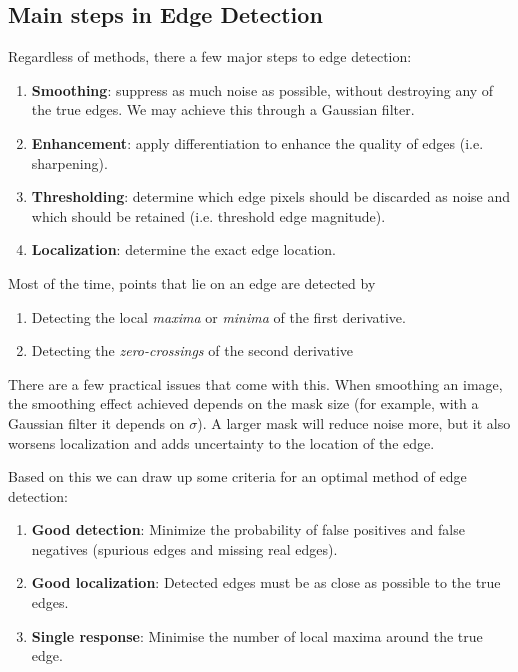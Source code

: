 \documentclass{article}
\begin{document}
	\subsection{Main steps in Edge Detection}
	Regardless of methods, there a few major steps to edge detection:
		\begin{enumerate}
			\item \textbf{Smoothing}: suppress as much noise as possible, without destroying any of the true edges. We may achieve this through a Gaussian filter.
			\item \textbf{Enhancement}: apply differentiation to enhance the quality of edges (i.e. sharpening).
			\item \textbf{Thresholding}: determine which edge pixels should be discarded as  noise and which should be retained (i.e. threshold edge magnitude).
			
			\item \textbf{Localization}: determine the exact edge location.
		\end{enumerate}

	\par
	Most of the time, points that lie on an edge are detected by 
		\begin{enumerate}
			\item Detecting the local \textit{maxima} or \textit{minima} of the first derivative.
			\item Detecting the \textit{zero-crossings} of the second derivative
		\end{enumerate}
		
	There are a few practical issues that come with this. When smoothing an image, the smoothing effect achieved depends on the mask size (for example, with a Gaussian filter it depends on $\sigma$). A larger mask will reduce noise more, but it also worsens localization and adds uncertainty to the location of the edge.
	
	Based on this we can draw up some criteria for an optimal method of edge detection:
	\begin{enumerate}
		\item \textbf{Good detection}: Minimize the probability of false positives and false negatives (spurious edges and missing real edges).
		\item \textbf{Good localization}: Detected edges must be as close as possible to the true edges.
		\item \textbf{Single response}: Minimise the number of local maxima around the true edge.
	\end{enumerate}
\end{document}

